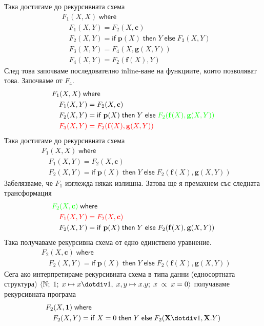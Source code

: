 \documentclass[14pt]{extarticle}
\begin{document}
Така достигаме до рекурсивната схема
\begin{align*}
    & F_1(X, X) \; \mathsf{where} \\
    & \quad  F_1(X, Y) = F_2(X, \mathbf c) \\
    & \quad F_2(X, Y) = \mathsf{if} \; \mathbf p(X) \; \mathsf{then} \; Y  \; \mathsf{else} \; F_3(X, Y) \\
    & \quad F_3(X, Y) = F_4(X, \mathbf g(X, Y)) \\
    & \quad F_4(X, Y) = F_2(\mathbf f(X), Y)
\end{align*}
След това започваме последователно inline-ване на функциите, които позволяват това. Започваме от \(F_4\).
\begin{align*}
    & F_1(X, X) \; \mathsf{where} \\
    & \quad  F_1(X, Y) = F_2(X, \mathbf c) \\
    & \quad F_2(X, Y) = \mathsf{if} \; \mathbf p(X) \; \mathsf{then} \; Y  \; \mathsf{else} \; \textcolor{green}{F_2(\mathbf f(X), \mathbf g(X, Y))} \\
    & \quad \color{red} F_3(X, Y) = F_2(\mathbf f (X), \mathbf g(X, Y))
\end{align*}
Така достигаме до рекурсивната схема
\begin{align*}
    & F_1(X, X) \; \mathsf{where} \\
    & \quad  F_1(X, Y) = F_2(X, \mathbf c) \\
    & \quad F_2(X, Y) = \mathsf{if} \; \mathbf p(X) \; \mathsf{then} \; Y  \; \mathsf{else} \; F_2(\mathbf f(X), \mathbf g(X, Y))
\end{align*}
Забелязваме, че \(F_1\) изглежда някак излишна. Затова ще я премахнем със следната трансформация
\begin{align*}
    & \textcolor{green}{F_2(X, \mathbf c)} \; \mathsf{where} \\
    & \color{red} \quad  F_1(X, Y) = F_2(X, \mathbf c) \\
    & \quad F_2(X, Y) = \mathsf{if} \; \mathbf p(X) \; \mathsf{then} \; Y  \; \mathsf{else} \; F_2(\mathbf f(X), \mathbf g(X, Y))
\end{align*}
Така получаваме рекурсивна схема от едно единствено уравнение.
\begin{align*}
    & F_2(X, \mathbf c) \; \mathsf{where} \\
    & \quad F_2(X, Y) = \mathsf{if} \; \mathbf p(X) \; \mathsf{then} \; Y  \; \mathsf{else} \; F_2(\mathbf f(X), \mathbf g(X, Y))
\end{align*}
Сега ако интерпретираме рекурсивната схема в типа данни (едносортната структура)
\(\langle \mathbb N;\; 1;\; x \mapsto x \dotdiv 1,\; x, y \mapsto x.y;\; x \;\propto\; x = 0  \rangle\) получаваме рекурсивната програма
\begin{align*}
    & F_2(X, \mathbf 1) \; \mathsf{where} \\
    & \quad F_2(X, Y) = \mathsf{if} \; X = 0 \; \mathsf{then} \; Y  \; \mathsf{else} \; F_2(\mathbf X \dotdiv 1 , \mathbf X.Y)
\end{align*}
\end{document}
